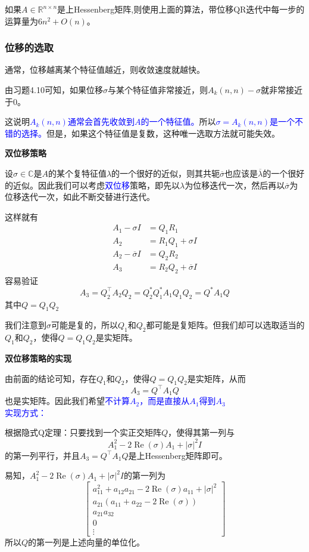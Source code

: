 \documentclass[12pt,a4paper]{article}
\begin{document}
如果$A \in \mathbb{R}^{n \times n}$是上Hessenberg矩阵,则使用上面的算法，带位移QR迭代中每一步的运算量为$6 n^{2}+O(n)$。

\subsubsection{位移的选取}
通常，位移越离某个特征值越近，则收敛速度就越快。

由习题4.10可知，如果位移$\sigma$与某个特征值非常接近，则$A_{k}(n, n)-\sigma$就非常接近于0。

这说明\textcolor{blue}{$A_k(n,n)$通常会首先收敛到$A$的一个特征值。}所以\textcolor{blue}{$\sigma=A_{k}(n, n)$是一个不错的选择。}但是，如果这个特征值是复数，这种唯一选取方法就可能失效。

\textbf{双位移策略}

设$\sigma \in \mathbb{C}$是$A$的某个复特征值$\lambda$的一个很好的近似，则其共轭$\overline{\sigma}$也应该是$\overline{\lambda}$的一个很好的近似。因此我们可以考虑\textcolor{blue}{双位移}策略，即先以$\lambda$为位移迭代一次，然后再以$\overline{\sigma}$为位移迭代一次，如此不断交替进行迭代。

这样就有$$
\begin{aligned} A_{1}-\sigma I &=Q_{1} R_{1} \\ A_{2} &=R_{1} Q_{1}+\sigma I \\ A_{2}-\overline{\sigma} I &=Q_{2} R_{2} \\ A_{3} &=R_{2} Q_{2}+\overline{\sigma} I \end{aligned}
$$容易验证$$
A_{3}=Q_{2}^{\top} A_{2} Q_{2}=Q_{2}^{*} Q_{1}^{*} A_{1} Q_{1} Q_{2}=Q^{*} A_{1} Q
$$其中$Q=Q_1Q_2$

我们注意到$\sigma$可能是复的，所以$Q_1$和$Q_2$都可能是复矩阵。但我们却可以选取适当的$Q_1$和$Q_2$，使得$Q=Q_1Q_2$是实矩阵。

\textbf{双位移策略的实现}

由前面的结论可知，存在$Q_1$和$Q_2$，使得$Q=Q_1Q_2$是实矩阵，从而$$
A_{3}=Q^{\top} A_{1} Q
$$也是实矩阵。因此我们希望\textcolor{blue}{不计算$A_2$，而是直接从$A_1$得到$A_3$}\\
\textcolor{blue}{实现方式：}

根据隐式Q定理：只要找到一个实正交矩阵$Q$，使得其第一列与$$
A_{1}^{2}-2 \operatorname{Re}(\sigma) A_{1}+|\sigma|^{2} I
$$的第一列平行，并且$A_{3}=Q^{\top} A_{1} Q$是上Hessenberg矩阵即可。

易知，$A_{1}^{2}-2 \operatorname{Re}(\sigma) A_{1}+|\sigma|^{2} I$的第一列为\begin{equation}
\left[\begin{array}{c}{a_{11}^{2}+a_{12} a_{21}-2 \operatorname{Re}(\sigma) a_{11}+|\sigma|^{2}} \\ {a_{21}\left(a_{11}+a_{22}-2 \operatorname{Re}(\sigma)\right)} \\ {a_{21} a_{32}} \\ {0} \\ {\vdots}\end{array}\right]
\end{equation}
所以$Q$的第一列是上述向量的单位化。
\end{document}
